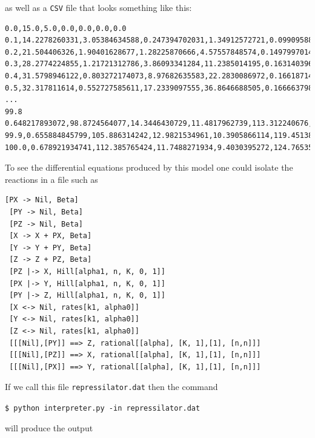 as well as a {\tt CSV} file that looks something like this:
\begin{center}
\begin{minipage}{5.5in}
\begin{scriptsize}
\begin{Verbatim}[frame=single]
0.0,15.0,5.0,0.0,0.0,0.0,0.0
0.1,14.2278260331,3.05384634588,0.247394702031,1.34912572721,0.0990958803047,23.562567514
0.2,21.504406326,1.90401628677,1.28225870666,4.57557848574,0.149799701424,37.9011356108
0.3,28.2774224855,1.21721312786,3.86093341284,11.2385014195,0.16314039654,38.2545583466
0.4,31.5798946122,0.803272174073,8.97682635583,22.2830086972,0.166187145597,35.2157392832
0.5,32.317811614,0.552727585611,17.2339097555,36.8646688505,0.166663798479,31.9877430887
...
99.8 0.648217893072,98.8724564077,14.3446430729,11.4817962739,113.312240676,0.649415887468
99.9,0.655884845799,105.886314242,12.9821534961,10.3905866114,119.451386878,0.685929274901
100.0,0.678921934741,112.385765424,11.7488271934,9.4030395272,124.765357623,0.74177680618
\end{Verbatim}
\end{scriptsize}
\end{minipage}
\end{center}
To see the differential equations produced by this model one could isolate the reactions in a file such as 
\begin{center}
\begin{minipage}{4in}
\begin{scriptsize}
\begin{Verbatim}[frame=single]
 [PX -> Nil, Beta]
 [PY -> Nil, Beta]
 [PZ -> Nil, Beta]
 [X -> X + PX, Beta]
 [Y -> Y + PY, Beta]
 [Z -> Z + PZ, Beta]
 [PZ |-> X, Hill[alpha1, n, K, 0, 1]]
 [PX |-> Y, Hill[alpha1, n, K, 0, 1]]
 [PY |-> Z, Hill[alpha1, n, K, 0, 1]]
 [X <-> Nil, rates[k1, alpha0]]
 [Y <-> Nil, rates[k1, alpha0]]
 [Z <-> Nil, rates[k1, alpha0]]
 [[[Nil],[PY]] ==> Z, rational[[alpha], [K, 1],[1], [n,n]]]
 [[[Nil],[PZ]] ==> X, rational[[alpha], [K, 1],[1], [n,n]]]
 [[[Nil],[PX]] ==> Y, rational[[alpha], [K, 1],[1], [n,n]]]
\end{Verbatim}
\end{scriptsize}
\end{minipage}
\end{center}
If we call this file {\tt repressilator.dat} then the command
\begin{center}
{\tt \$ python interpreter.py -in repressilator.dat}
\end{center}
will produce the output
